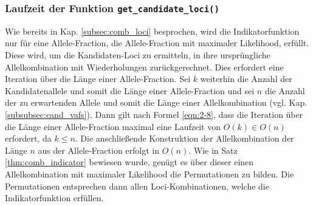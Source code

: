 \subsubsection{Laufzeit der Funktion \lstinline|get_candidate_loci()|}

Wie bereits in Kap. \ref{subsec:comb_loci} besprochen, wird die Indikatorfunktion nur für eine Allele-Fraction, die Allele-Fraction mit maximaler Likelihood, erfüllt. Diese wird, um die \linebreak Kandidaten-Loci zu ermitteln, in ihre ursprüngliche Allelkombination mit Wiederholungen zurückgerechnet. Dies erfordert eine Iteration über die Länge einer Allele-Fraction. Sei $k$ weiterhin die Anzahl der Kandidatenallele und somit die Länge einer Allele-Fraction und sei $n$ die Anzahl der zu erwartenden Allele und somit die Länge einer Allelkombination (vgl. Kap. \ref{subsubsec:cand_vafs}). Dann gilt nach Formel \eqref{eqn:2-8}, dass die Iteration über die Länge einer Allele-Fraction maximal eine Laufzeit von $O(k) \in O(n)$ erfordert, da $k \leq n$. Die anschließende Konstruktion der Allelkombination der Länge $n$ aus der Allele-Fraction erfolgt in $O(n)$. Wie in Satz \ref{thm:comb_indicator} bewiesen wurde, genügt es über dieser einen Allelkombination mit maximaler Likelihood die Permutationen zu bilden. Die Permutationen entsprechen dann allen Loci-Kombinationen, welche die Indikatorfunktion erfüllen. \\

